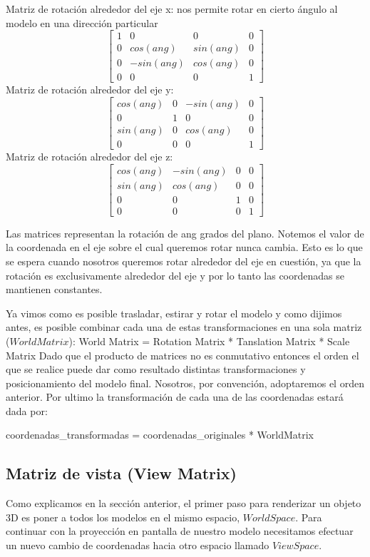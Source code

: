\documentclass[a4paper]{article}
\begin{document}
Matriz de rotación alrededor del eje x: nos permite rotar en cierto ángulo al modelo en una dirección particular
\[
\begin{bmatrix}
1 & 0 & 0 & 0 \\
0 & cos(ang) & sin(ang) & 0 \\
0 & -sin(ang) & cos(ang) & 0 \\
0 & 0 & 0 & 1  
\end{bmatrix}
\]
Matriz de rotación alrededor del eje y:
\[
\begin{bmatrix}
cos(ang) & 0 & -sin(ang) & 0 \\
0 & 1 & 0 & 0 \\
sin(ang) & 0 & cos(ang) & 0 \\
0 & 0 & 0 & 1  
\end{bmatrix}
\]
Matriz de rotación alrededor del eje z:
\[
\begin{bmatrix}
cos(ang) & -sin(ang) & 0 & 0 \\
sin(ang) & cos(ang) & 0 & 0 \\
0 & 0 & 1 & 0 \\
0 & 0 & 0 & 1  
\end{bmatrix}
\]


Las  matrices representan  la rotación de ang grados del plano. Notemos el valor de la coordenada en el eje sobre el cual queremos rotar nunca cambia. Esto es lo que se espera cuando nosotros queremos rotar alrededor del eje en cuestión, ya que  la rotación es exclusivamente alrededor del eje y por lo tanto las coordenadas se mantienen constantes.

\par Ya vimos como es posible trasladar, estirar y rotar el modelo y como dijimos antes, es posible combinar cada una de estas transformaciones en una sola matriz ($World Matrix$): \newline
World Matrix = Rotation Matrix * Tanslation Matrix * Scale Matrix\newline  \newline
 Dado que el producto de matrices no es conmutativo entonces el orden el que se realice puede dar como resultado distintas transformaciones y posicionamiento del modelo final. Nosotros, por convención, adoptaremos el orden anterior.
Por ultimo la transformación de cada una de las coordenadas estará dada por: \newline

coordenadas\_transformadas = coordenadas\_originales * WorldMatrix 


\subsection{Matriz de vista (View Matrix)}
Como explicamos en la sección anterior, el primer paso para  renderizar un objeto 3D  es poner a todos los modelos en el mismo espacio, $World Space$. Para continuar con la proyección en pantalla de nuestro modelo necesitamos efectuar un nuevo cambio de coordenadas hacia otro espacio llamado $View Space$.
\end{document}
